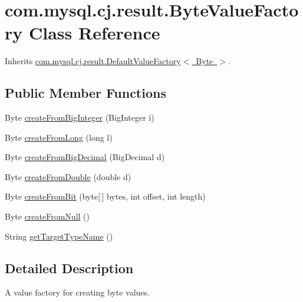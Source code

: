 \hypertarget{classcom_1_1mysql_1_1cj_1_1result_1_1_byte_value_factory}{}\section{com.\+mysql.\+cj.\+result.\+Byte\+Value\+Factory Class Reference}
\label{classcom_1_1mysql_1_1cj_1_1result_1_1_byte_value_factory}


Inherits \mbox{\hyperlink{classcom_1_1mysql_1_1cj_1_1result_1_1_default_value_factory}{com.\+mysql.\+cj.\+result.\+Default\+Value\+Factory$<$ Byte $>$}}.

\subsection*{Public Member Functions}
\begin{DoxyCompactItemize}
\item 
Byte \mbox{\hyperlink{classcom_1_1mysql_1_1cj_1_1result_1_1_byte_value_factory_a326ae657497611999db6dba7beb21696}{create\+From\+Big\+Integer}} (Big\+Integer i)
\item 
Byte \mbox{\hyperlink{classcom_1_1mysql_1_1cj_1_1result_1_1_byte_value_factory_adc6c1a9a4508dccd509e29e224d76c67}{create\+From\+Long}} (long l)
\item 
Byte \mbox{\hyperlink{classcom_1_1mysql_1_1cj_1_1result_1_1_byte_value_factory_a9f56aca043f69abc0869d276135c77f9}{create\+From\+Big\+Decimal}} (Big\+Decimal d)
\item 
Byte \mbox{\hyperlink{classcom_1_1mysql_1_1cj_1_1result_1_1_byte_value_factory_a000d77124a845e007445182a5a50997f}{create\+From\+Double}} (double d)
\item 
Byte \mbox{\hyperlink{classcom_1_1mysql_1_1cj_1_1result_1_1_byte_value_factory_a3ba3035bf94783603fbe3c7badbd5414}{create\+From\+Bit}} (byte\mbox{[}$\,$\mbox{]} bytes, int offset, int length)
\item 
Byte \mbox{\hyperlink{classcom_1_1mysql_1_1cj_1_1result_1_1_byte_value_factory_a64af0d441cace35013b75399774166b1}{create\+From\+Null}} ()
\item 
String \mbox{\hyperlink{classcom_1_1mysql_1_1cj_1_1result_1_1_byte_value_factory_adc8d86c2f4f80b19aa6ba9715410be9f}{get\+Target\+Type\+Name}} ()
\end{DoxyCompactItemize}


\subsection{Detailed Description}
A value factory for creating byte values. 


